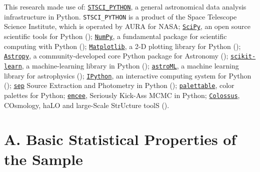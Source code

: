\documentclass[a4paper,fleqn,usenatbib]{mnras}
\begin{document}
  This research made use of:
  \href{http://www.stsci.edu/institute/software_hardware/pyraf/stsci\_python}{\texttt{STSCI\_PYTHON}},
      a general astronomical data analysis infrastructure in Python. 
      \texttt{STSCI\_PYTHON} is a product of the Space Telescope Science Institute, 
      which is operated by AURA for NASA;
  \href{http://www.scipy.org/}{\texttt{SciPy}},
      an open source scientific tools for Python (\citealt{SciPy});
  \href{http://www.numpy.org/}{\texttt{NumPy}}, 
      a fundamental package for scientific computing with Python (\citealt{NumPy});
  \href{http://matplotlib.org/}{\texttt{Matplotlib}}, 
      a 2-D plotting library for Python (\citealt{Matplotlib});
  \href{http://www.astropy.org/}{\texttt{Astropy}}, a community-developed 
      core Python package for Astronomy (\citealt{AstroPy}); 
  \href{http://scikit-learn.org/stable/index.html}{\texttt{scikit-learn}},
      a machine-learning library in Python (\citealt{scikit-learn}); 
  \href{http://www.astroml.org/}{\texttt{astroML}}, 
      a machine learning library for astrophysics (\citealt{astroML});
  \href{https://ipython.org}{\texttt{IPython}}, 
      an interactive computing system for Python (\citealt{IPython});
  \href{https://github.com/kbarbary/sep}{\texttt{sep}} 
      Source Extraction and Photometry in Python (\citealt{PythonSEP});
  \href{https://jiffyclub.github.io/palettable/}{\texttt{palettable}},
      color palettes for Python;
  \href{http://dan.iel.fm/emcee/current/}{\texttt{emcee}}, 
      Seriously Kick-Ass MCMC in Python;
  \href{http://bdiemer.bitbucket.org/}{\texttt{Colossus}}, 
      COsmology, haLO and large-Scale StrUcture toolS (\citealt{Colossus}).






\appendix


\section{A. Basic Statistical Properties of the Sample} 
	\label{app:sedasic} 
    
\end{document}
